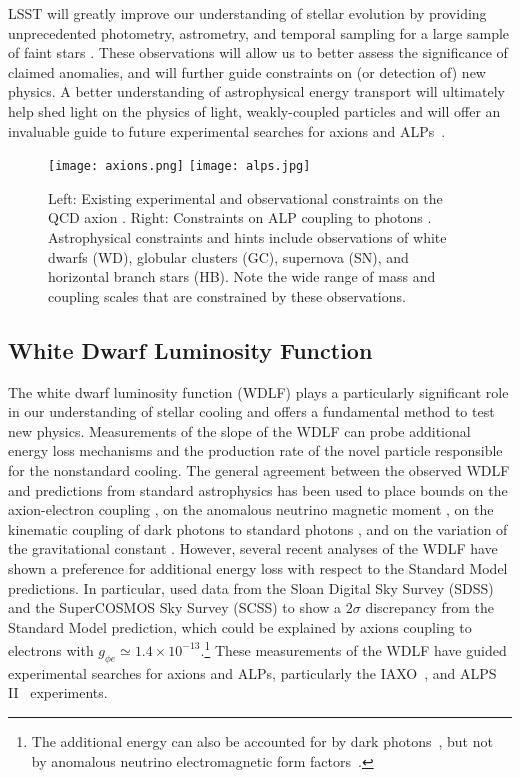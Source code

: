 LSST will greatly improve our understanding of stellar evolution by providing unprecedented photometry, astrometry, and temporal sampling for a large sample of faint stars \citep{0912.0201}.
These observations will allow us to better assess the significance of claimed anomalies, and will further guide constraints on (or detection of) new physics.
A better understanding of astrophysical energy transport will ultimately help shed light on the physics of light, weakly-coupled particles and will offer an invaluable guide to future experimental searches for axions and ALPs~\citep{Irastorza:2018dyq}.

\begin{figure}[t]
\centering
\texttt{[image: axions.png]}
\texttt{[image: alps.jpg]}
\caption{Left: Existing experimental and observational constraints on the QCD axion \citep{Redino:2015}.  
Right: Constraints on ALP coupling to photons \citep{Ringwald:2012}.
Astrophysical constraints and hints include observations of white dwarfs (WD), globular clusters (GC), supernova (SN), and horizontal branch stars (HB).
Note the wide range of mass and coupling scales that are constrained by these observations.
\label{fig:axions}
}
\end{figure}

\subsection{White Dwarf Luminosity Function}

The white dwarf luminosity function (WDLF) plays a particularly significant role in our understanding of stellar cooling and offers a fundamental method to test new physics.
Measurements of the slope of the WDLF can probe additional energy loss mechanisms and the production rate of the novel particle responsible for the nonstandard cooling.
The general agreement between the observed WDLF and predictions from standard astrophysics has been used to place bounds on the axion-electron coupling \citep{Isern:2008nt,Bertolami:2014wua}, on the anomalous neutrino magnetic moment \citep{Bertolami:2014noa}, on the kinematic coupling of dark photons to standard photons \citep{Chang:2016qfl}, and on the variation of the gravitational constant \citep{Althaus:2011ca}.
However, several recent analyses of the WDLF have shown a preference for additional energy loss with respect to the Standard Model predictions.
In particular, \cite{Bertolami:2014wua} used data from the Sloan Digital Sky Survey (SDSS) and the SuperCOSMOS Sky Survey (SCSS) to show a $2 \sigma$ discrepancy from the Standard Model prediction, which could be explained by axions coupling to electrons with $g_{\phi e}\simeq 1.4\times 10^{-13}$.\footnote{The additional energy can also be accounted for by dark photons~\citep{Giannotti:2015kwo,Chang:2016qfl}, but not by anomalous neutrino electromagnetic form factors~\citep{Bertolami:2014noa}.}
These measurements of the WDLF have guided experimental searches for axions and ALPs, particularly the IAXO~\citep{Irastorza:2011gs,Armengaud:2014gea}, and ALPS II~\citep{Bahre:2013ywa,ALPSII} experiments.

